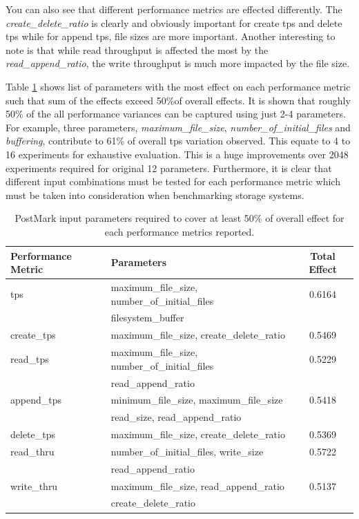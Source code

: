 You can also see that different performance metrics are effected differently. 
The \emph{create\_delete\_ratio} is clearly and obviously important for create tps and delete tps while for append tps, file sizes are more important. 
Another interesting to note is that while read throughput is affected the most by the \emph{read\_append\_ratio}, the write throughput is much more impacted by the file size.

Table \ref{pm_50_t} shows list of parameters with the most effect on each performance metric such that sum of the effects exceed 50\%of overall effects. 
It is shown that roughly 50\% of the all performance variances can be captured using just 2-4 parameters. 
For example, three parameters, \emph{maximum\_file\_size}, \emph{number\_of\_initial\_files} and \emph{buffering}, contribute to 61\% of overall tps variation observed. 
This equate to 4 to 16 experiments for exhaustive evaluation. 
This is a huge improvements over 2048 experiments required for original 12 parameters. 
Furthermore, it is clear that different input combinations must be tested for each performance metric which must be taken into consideration when benchmarking storage systems. 

\begin{table}
\caption{PostMark input parameters required to cover at least 50\% of overall effect for each performance metrics reported.}
\label{pm_50_t}
\centering
\begin{tabularx}{\textwidth}{
  l | 
  X 
  c
}
\hline
\bfseries Performance Metric   &\bfseries Parameters           &\bfseries Total Effect  \\
\hline\hline
tps           & maximum\_file\_size, number\_of\_initial\_files &0.6164   \\
              & filesystem\_buffer                              &         \\
\hline
create\_tps   & maximum\_file\_size, create\_delete\_ratio      &0.5469   \\
\hline
read\_tps     & maximum\_file\_size, number\_of\_initial\_files &0.5229   \\
              & read\_append\_ratio                             &         \\
\hline
append\_tps   & minimum\_file\_size, maximum\_file\_size        &0.5418   \\
              & read\_size, read\_append\_ratio                 &         \\
\hline
delete\_tps   & maximum\_file\_size, create\_delete\_ratio      &0.5369   \\
\hline
read\_thru    & number\_of\_initial\_files, write\_size         &0.5722   \\
              & read\_append\_ratio                             &         \\
\hline
write\_thru   & maximum\_file\_size, read\_append\_ratio        &0.5137   \\
              & create\_delete\_ratio                           &         \\
\hline
\end{tabularx}
\end{table}

